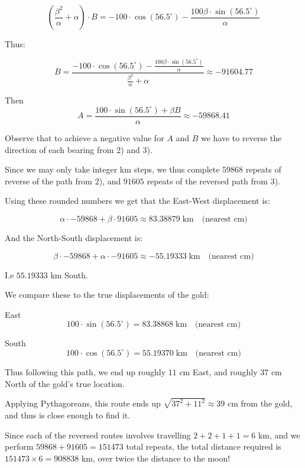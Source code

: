 \documentclass{article}
\begin{document}
\begin{enumerate}
\begin{equation}
    \left( \frac{\beta^2}{\alpha} + \alpha \right) \cdot B = -100\cdot \cos(56.5^\circ) - \frac{100\beta\cdot\sin(56.5^\circ)}{\alpha}
\end{equation}

Thus:

\begin{equation}
B = \frac{-100\cdot \cos(56.5^\circ) - \frac{100\beta\cdot\sin(56.5^\circ)}{\alpha}}{ \frac{\beta^2}{\alpha} + \alpha} \approx -91604.77
\end{equation}

Then
\begin{equation}
A = \frac{100\cdot\sin(56.5^\circ)+\beta B}{\alpha} \approx -59868.41
\end{equation}

Observe that to achieve a negative value for $A$ and $B$ we have to reverse the direction of each bearing from 2) and 3). 

Since we may only take integer km steps, we thus complete $59868$ repeats of reverse of the path from 2), and $91605$ repeats of the reversed path from 3).

Using these rounded numbers we get that the East-West displacement is:


$$
\alpha \cdot -59868 + \beta \cdot 91605\approx 83.38879 \; \text{km} \quad \text{(nearest cm)}
$$

And the North-South displacement is:

$$
\beta \cdot -59868  + \alpha \cdot -91605 \approx -55.19333 \; \text{km} \quad \text{(nearest cm)}
$$

I.e $55.19333$ km South. 

We compare these to the true displacements of the gold:

East
$$
100 \cdot \sin (56.5^\circ) = 83.38868 \; \text{km} \quad \text{(nearest cm)}
$$

South
$$
100 \cdot \cos (56.5^\circ) = 55.19370 \; \text{km} \quad \text{(nearest cm)}
$$

Thus following this path, we end up roughly $11$ cm East, and roughly $37$ cm North of the gold's true location.

Applying Pythagoreans, this route ends up $\sqrt{37^2 + 11^2} \approx 39$ cm from the gold, and thus is close enough to find it.

Since each of the reversed routes involves travelling $2+2+1+1=6$ km, and we perform $59868+91605=151473$ total repeats, the total distance required is $151473\times 6 = 908838$ km, over twice the distance to the moon!


\end{enumerate}
\end{document}
